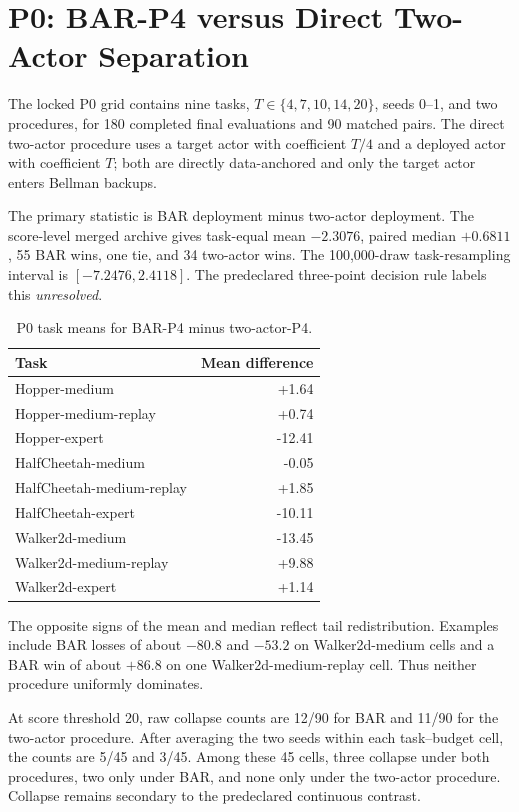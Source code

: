 \documentclass[twoside]{article}
\begin{document}
\section{P0: BAR-P4 versus Direct Two-Actor Separation}
The locked P0 grid contains nine tasks, $T\in\{4,7,10,14,20\}$, seeds 0--1, and two procedures, for 180 completed final evaluations and 90 matched pairs. The direct two-actor procedure uses a target actor with coefficient $T/4$ and a deployed actor with coefficient $T$; both are directly data-anchored and only the target actor enters Bellman backups.

The primary statistic is BAR deployment minus two-actor deployment. The score-level merged archive gives task-equal mean $-2.3076$, paired median $+0.6811$, 55 BAR wins, one tie, and 34 two-actor wins. The 100,000-draw task-resampling interval is $[-7.2476,2.4118]$. The predeclared three-point decision rule labels this \emph{unresolved}.

\begin{table}[h]
\caption{P0 task means for BAR-P4 minus two-actor-P4.}
\centering\small
\begin{tabular}{lr}
\toprule
Task & Mean difference\\
\midrule
Hopper-medium & +1.64\\
Hopper-medium-replay & +0.74\\
Hopper-expert & -12.41\\
HalfCheetah-medium & -0.05\\
HalfCheetah-medium-replay & +1.85\\
HalfCheetah-expert & -10.11\\
Walker2d-medium & -13.45\\
Walker2d-medium-replay & +9.88\\
Walker2d-expert & +1.14\\
\bottomrule
\end{tabular}
\end{table}

The opposite signs of the mean and median reflect tail redistribution. Examples include BAR losses of about $-80.8$ and $-53.2$ on Walker2d-medium cells and a BAR win of about $+86.8$ on one Walker2d-medium-replay cell. Thus neither procedure uniformly dominates.

At score threshold 20, raw collapse counts are 12/90 for BAR and 11/90 for the two-actor procedure. After averaging the two seeds within each task--budget cell, the counts are 5/45 and 3/45. Among these 45 cells, three collapse under both procedures, two only under BAR, and none only under the two-actor procedure. Collapse remains secondary to the predeclared continuous contrast.
\end{document}
